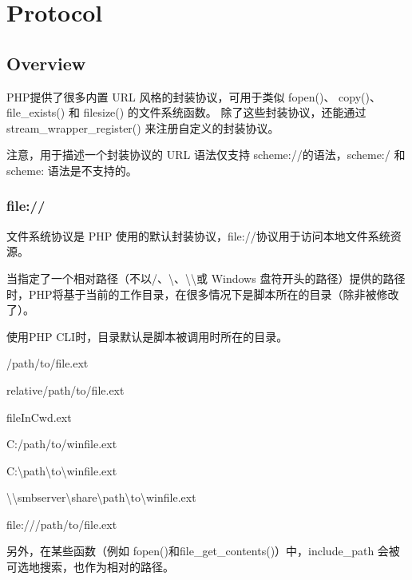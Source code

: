 \part{Protocol}


\chapter{Overview}


PHP提供了很多内置 URL 风格的封装协议，可用于类似 fopen()、 copy()、 file\_exists() 和 filesize() 的文件系统函数。 除了这些封装协议，还能通过 stream\_wrapper\_register() 来注册自定义的封装协议。

注意，用于描述一个封装协议的 URL 语法仅支持 scheme://的语法，scheme:/ 和 scheme: 语法是不支持的。

\section{file://}

文件系统协议是 PHP 使用的默认封装协议，file://协议用于访问本地文件系统资源。

当指定了一个相对路径（不以/、\textbackslash 、\textbackslash \textbackslash 或 Windows 盘符开头的路径）提供的路径时，PHP将基于当前的工作目录，在很多情况下是脚本所在的目录（除非被修改了）。

使用PHP CLI时，目录默认是脚本被调用时所在的目录。

\begin{compactitem}
\item /path/to/file.ext
\item relative/path/to/file.ext
\item fileInCwd.ext
\item C:/path/to/winfile.ext
\item C:\textbackslash path\textbackslash to\textbackslash winfile.ext
\item \textbackslash \textbackslash smbserver\textbackslash share\textbackslash path\textbackslash to\textbackslash winfile.ext
\item file:///path/to/file.ext
\end{compactitem}

另外，在某些函数（例如 fopen()和file\_get\_contents()）中，include\_path 会被可选地搜索，也作为相对的路径。

